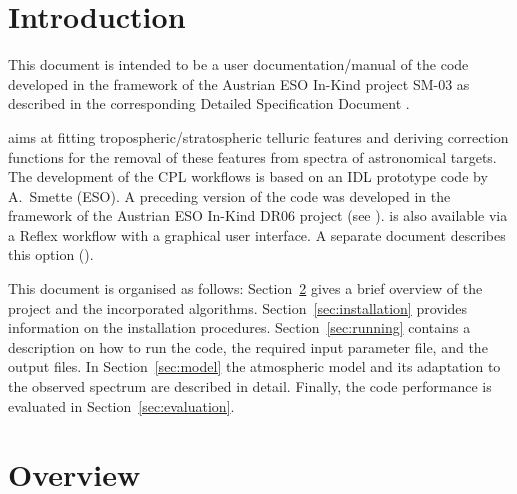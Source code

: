 \section{Introduction}\label{sec:introduction}
This document is intended to be a user documentation/manual of the code
\mf{} developed in the framework of the Austrian ESO In-Kind project
SM-03 as described in the corresponding Detailed Specification Document
\cite{SM03DS}.

\mf{} aims at fitting tropospheric/stratospheric telluric features and
deriving correction functions for the removal of these features from spectra of
astronomical targets. The development of the \ac{CPL} workflows is based on an
\ac{IDL} prototype code by A.~Smette (ESO). A preceding version of the code was
developed in the framework of the Austrian ESO In-Kind DR06 project (see
\cite{DR06UM}). \mf{} is also available via a Reflex workflow
with a graphical user interface. A separate document describes this option
(\cite{MFGUI}).

This document is organised as follows: Section~\ref{sec:overview} gives a
brief overview of the project and the incorporated algorithms.
Section~\ref{sec:installation} provides information on the installation
procedures. Section~\ref{sec:running} contains a description on how to run the
code, the required input parameter file, and the output files. In
Section~\ref{sec:model} the atmospheric model and its adaptation to the
observed spectrum are described in detail. Finally, the code performance is
evaluated in Section~\ref{sec:evaluation}.

\section{Overview}\label{sec:overview}
